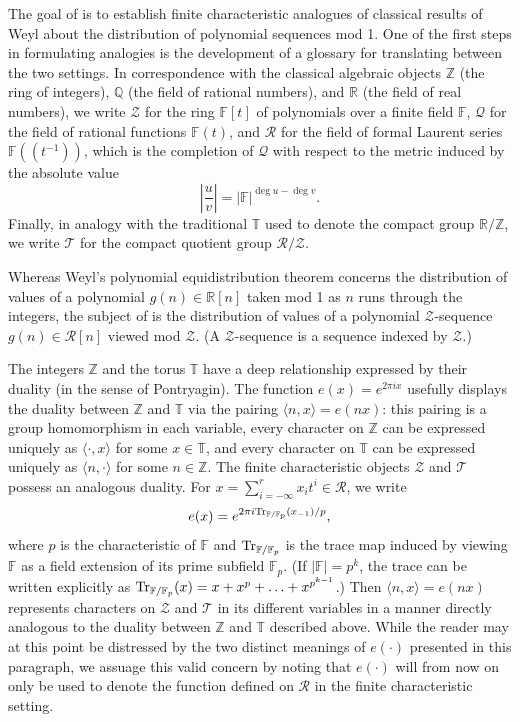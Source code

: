 \documentclass[11pt]{amsart}
\theoremstyle{theorem}
\theoremstyle{definition}
\newcommand{\Z}{\mathbb{Z}}
\newcommand{\Q}{\mathbb{Q}}
\newcommand{\R}{\mathbb{R}}
\newcommand{\T}{\mathbb{T}}
\newcommand{\F}{\mathbb{F}}
\newcommand{\mZ}{\mathcal{Z}}
\newcommand{\mQ}{\mathcal{Q}}
\newcommand{\mR}{\mathcal{R}}
\newcommand{\mT}{\mathcal{T}}
\begin{document}
The goal of \cite{bl} is to establish finite characteristic analogues of classical results of Weyl \cite{weyl} about the distribution of polynomial sequences mod 1.
One of the first steps in formulating analogies is the development of a glossary for translating between the two settings.
In correspondence with the classical algebraic objects $\Z$ (the ring of integers), $\Q$ (the field of rational numbers), and $\R$ (the field of real numbers), we write $\mZ$ for the ring $\F[t]$ of polynomials over a finite field $\F$, $\mQ$ for the field of rational functions $\F(t)$, and $\mR$ for the field of formal Laurent series $\F((t^{-1}))$, which is the completion of $\mQ$ with respect to the metric induced by the absolute value
\begin{equation*}
	\left| \frac{u}{v} \right| = |\F|^{\deg{u} - \deg{v}}.
\end{equation*}
Finally, in analogy with the traditional $\T$ used to denote the compact group $\R/\Z$, we write $\mT$ for the compact quotient group $\mR/\mZ$.

Whereas Weyl's polynomial equidistribution theorem concerns the distribution of values of a polynomial $g(n) \in \R[n]$ taken mod 1 as $n$ runs through the integers, the subject of \cite{bl} is the distribution of values of a polynomial $\mZ$-sequence $g(n) \in \mR[n]$ viewed mod $\mZ$.
(A $\mZ$-sequence is a sequence indexed by $\mZ$.)

The integers $\Z$ and the torus $\T$ have a deep relationship expressed by their duality (in the sense of Pontryagin).
The function $e(x) = e^{2\pi i x}$ usefully displays the duality between $\Z$ and $\T$ via the pairing $\langle n,x \rangle = e(nx)$: this pairing is a group homomorphism in each variable, every character on $\Z$ can be expressed uniquely as $\langle \cdot, x \rangle$ for some $x \in \T$, and every character on $\T$ can be expressed uniquely as $\langle n, \cdot \rangle$ for some $n \in \Z$.
The finite characteristic objects $\mZ$ and $\mT$ possess an analogous duality.
For $x = \sum_{i=-\infty}^r x_i t^i \in \mR$, we write
\begin{equation*}
	e(x) = e^{2\pi i \textup{Tr}_{\F/\F_p}(x_{-1})/p},
\end{equation*}
where $p$ is the characteristic of $\F$ and $\textup{Tr}_{\F/\F_p}$ is the trace map induced by viewing $\F$ as a field extension of its prime subfield $\F_p$.
(If $|\F| = p^k$, the trace can be written explicitly as $\textup{Tr}_{\F/\F_p}(x) = x + x^p + \ldots + x^{p^{k-1}}$.)
Then $\langle n, x \rangle = e(nx)$ represents characters on $\mZ$ and $\mT$ in its different variables in a manner directly analogous to the duality between $\Z$ and $\T$ described above.
While the reader may at this point be distressed by the two distinct meanings of $e(\cdot)$ presented in this paragraph, we assuage this valid concern by noting that $e(\cdot)$ will from now on only be used to denote the function defined on $\mR$ in the finite characteristic setting.
\end{document}
